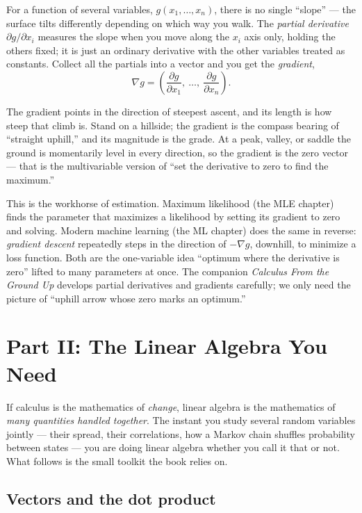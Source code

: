 For a function of several variables, $g(x_1,\dots,x_n)$, there is no single ``slope'' --- the surface
tilts differently depending on which way you walk. The \emph{partial derivative} $\partial g/\partial
x_i$ measures the slope when you move along the $x_i$ axis only, holding the others fixed; it is just
an ordinary derivative with the other variables treated as constants. Collect all the partials into a
vector and you get the \emph{gradient},
\[
  \nabla g = \left(\frac{\partial g}{\partial x_1},\ \dots,\ \frac{\partial g}{\partial x_n}\right).
\]

\begin{intuitionbox}
The gradient points in the direction of steepest ascent, and its length is how steep that climb is.
Stand on a hillside; the gradient is the compass bearing of ``straight uphill,'' and its magnitude is
the grade. At a peak, valley, or saddle the ground is momentarily level in every direction, so the
gradient is the zero vector --- that is the multivariable version of ``set the derivative to zero to
find the maximum.''
\end{intuitionbox}

This is the workhorse of estimation. Maximum likelihood (the MLE chapter) finds the parameter that
maximizes a likelihood by setting its gradient to zero and solving. Modern machine learning (the ML
chapter) does the same in reverse: \emph{gradient descent} repeatedly steps in the direction of
$-\nabla g$, downhill, to minimize a loss function. Both are the one-variable idea ``optimum where
the derivative is zero'' lifted to many parameters at once. The companion \emph{Calculus From the
Ground Up} develops partial derivatives and gradients carefully; we only need the picture of ``uphill
arrow whose zero marks an optimum.''

\section{Part II: The Linear Algebra You Need}
\label{chAcla:la-intro}

If calculus is the mathematics of \emph{change}, linear algebra is the mathematics of \emph{many
quantities handled together}. The instant you study several random variables jointly --- their
spread, their correlations, how a Markov chain shuffles probability between states --- you are doing
linear algebra whether you call it that or not. What follows is the small toolkit the book relies on.

\subsection{Vectors and the dot product}
\label{chAcla:vectors}

